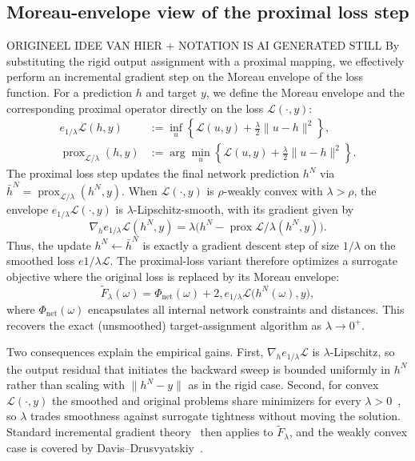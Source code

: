 \documentclass{article}
\theoremstyle{plain}
\theoremstyle{definition}
\theoremstyle{remark}
\begin{document}
\subsection{Moreau-envelope view of the proximal loss step }
\label{sec:moreau}
ORIGINEEL IDEE VAN HIER  + NOTATION IS AI GENERATED STILL\cite{bergmeister2025projection}
By substituting the rigid output assignment with a proximal mapping, we effectively perform an incremental gradient step on the Moreau envelope of the loss function. For a prediction $h$ and target $y$, we define the Moreau envelope and the corresponding proximal operator directly on the loss $\mathcal{L}(\cdot, y)$:
\begin{align*}
e_{1/\lambda} \mathcal{L}(h, y) &:= \inf_{u}\left\{ \mathcal{L}(u, y) + \frac{\lambda}{2}\|u - h\|^2\right\},\\
\operatorname{prox}_{\mathcal{L}/\lambda}(h, y) &:= \arg\min_{u}\left\{ \mathcal{L}(u, y) + \frac{\lambda}{2}\|u - h\|^2\right\}.
\end{align*}
The proximal loss step updates the final network prediction $h^N$ via $\bar h^N = \operatorname{prox}_{\mathcal{L}/\lambda}(h^N, y)$.
When $\mathcal{L}(\cdot, y)$ is $\rho$-weakly convex with $\lambda > \rho$, the envelope $e_{1/\lambda}\mathcal{L}(\cdot, y)$ is $\lambda$-Lipschitz-smooth, with its gradient given by
\begin{equation}
\nabla_h e_{1/\lambda}\mathcal{L}(h^N, y)
= \lambda\bigl(h^N - \operatorname{prox}{\mathcal{L}/\lambda}(h^N, y)\bigr).
\label{eq:moreau-grad}
\end{equation}
Thus, the update $h^N \gets \bar h^N$ is exactly a gradient descent step of size $1/\lambda$ on the smoothed loss $e{1/\lambda}\mathcal{L}$.
The proximal-loss variant therefore optimizes a surrogate objective where the original loss is replaced by its Moreau envelope:
\begin{equation}
\tilde F_\lambda(\omega)
= \Phi_{\mathrm{net}}(\omega) + 2,e_{1/\lambda}\mathcal{L}\bigl(h^N(\omega), y\bigr),
\end{equation}
where $\Phi_{\mathrm{net}}(\omega)$ encapsulates all internal network constraints and distances. This recovers the exact (unsmoothed) target-assignment algorithm as $\lambda \to 0^+$.

Two consequences explain the empirical gains. First, $\nabla_h e_{1/\lambda}\mathcal{L}$ is $\lambda$-Lipschitz, so the output residual that initiates the backward sweep is bounded uniformly in $h^N$ rather than scaling with $\|h^N - y\|$ as in the rigid case. Second, for convex $\mathcal{L}(\cdot, y)$ the smoothed and original problems share minimizers for every $\lambda > 0$~\cite{rockafellar1998variational}, so $\lambda$ trades smoothness against surrogate tightness without moving the solution. Standard incremental gradient theory~\cite[\S2.4]{bertsekas1997nonlinear} then applies to $\tilde F_\lambda$, and the weakly convex case is covered by Davis--Drusvyatskiy~\cite{davis2019stochastic}.
\end{document}
